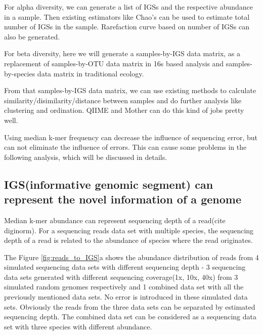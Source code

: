 For alpha diversity, we can generate a list of IGSs and the respective abundance in a sample. Then existing estimators like Chao's can be used to estimate total number of IGSs in the sample. Rarefaction curve based on number of IGSs can also be generated. 

For beta diversity, here we will generate a samples-by-IGS data matrix, as a replacement of samples-by-OTU data matrix in 16s based analysis and samples-by-species data matrix in traditional ecology. 


From that samples-by-IGS data matrix, we can use existing methods to calculate similarity/disimilarity/distance between samples and do further analysis like clustering and ordination. QIIME and Mother can do this kind of jobs pretty well.


Using median k-mer frequency can decrease the influence of sequencing error, but can not eliminate the influence of errors. This can cause some problems in the following analysis, which will be discussed in details.





\subsection{IGS(informative genomic segment) can represent the novel information of a genome}

Median k-mer abundance can represent sequencing depth of a read(cite diginorm). For a sequencing reads data set with multiple species, the sequencing depth of a read is related to the abundance of species where the read originates. 

The Figure \ref{fig:reads_to_IGS}a  shows the abundance distribution of reads from 4 simulated sequencing data sets with different sequencing depth - 3 sequencing data sets generated with different sequencing coverage(1x, 10x, 40x) from 3 simulated random genomes respectively and 1 combined data set with all the previously mentioned data sets. No error is introduced in these simulated data sets. Obviously the reads from the three data sets can be separated by estimated sequencing depth. The combined data set can be considered as a sequencing data set with three species with different abundance.

